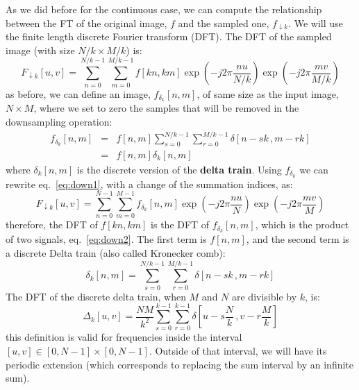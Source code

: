 As we did before for the continuous case, we can compute the relationship between the FT of the original image, $f$ and the sampled one, $f_{\downarrow k}$. We will use the finite length discrete Fourier transform (DFT). The DFT of the sampled image (with size $N/k \times M/k$) is:
\begin{equation}
F_{\downarrow k} \left[u,v\right]   = \sum_{n=0}^{N/k-1} \sum_{m=0}^{M/k-1} f\left[kn,km\right] \exp{ \left(  -j2\pi \frac{nu}{N/k} \right)}  \exp{ \left(  -j2\pi \frac{mv}{M/k} \right)}
\label{eq:down1}
\end{equation}
as before, we can define an image, $f_{\delta_k} \left[n,m\right]$, of same size as the input image, $N \times M$, where we set to zero the samples that will be removed in the downsampling operation:
\begin{eqnarray}
f_{\delta_k} \left[n,m\right] &=& f\left[n,m\right] \sum_{s=0}^{N/k-1} \sum_{r=0}^{M/k-1} \delta \left[n - sk \, ,m - rk \right] \\
&=&  f\left[n,m\right]  \delta_k \left[n,m\right] 
\label{eq:down2}
\end{eqnarray}
where $\delta_k \left[n,m\right]$ is the discrete version of the {\bf delta train}. Using $f_{\delta_k}$ we can rewrite eq.~\ref{eq:down1}, with a change of the summation indices, as:
\begin{equation}
F_{\downarrow k} \left[u,v\right]   = \sum_{n=0}^{N-1} \sum_{m=0}^{M-1} f_{\delta_k} \left[n,m\right] \exp{ \left(  -j2\pi \frac{nu}{N} \right)}  \exp{ \left(  -j2\pi \frac{mv}{M} \right)}
\end{equation}
therefore, the DFT of $f\left[kn,km\right]$ is the DFT of $f_{\delta_k} \left[n,m\right]$, which is the product of two signals, eq.~\ref{eq:down2}. The first term is $f\left[n,m\right]$, and the second term is a discrete Delta train (also called Kronecker comb): 
\begin{equation}
\delta_k \left[n,m\right]  =  \sum_{s=0}^{N/k-1} \sum_{r=0}^{M/k-1} \delta \left[n - sk \, ,m - rk \right]
\end{equation}
The DFT of the discrete delta train, when $M$ and $N$ are divisible by $k$, is:
\begin{equation}
\Delta_k \left[u,v\right]  = \frac{NM}{k^2}  \sum_{s=0}^{k-1} \sum_{r=0}^{k-1} \delta \left[u - s\frac{N}{k} \, ,v - r\frac{M}{k} \right]
\end{equation}
this definition is valid for frequencies inside the interval $[u,v] \in [0,N-1]\times[0,N-1]$. Outside of that interval, we will have its periodic extension (which corresponds to replacing the sum interval by an infinite sum). 

